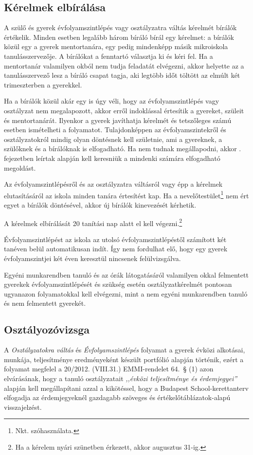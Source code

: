 
\subsection{Kérelmek elbírálása}

A szülő és gyerek évfolyamszintlépés vagy osztályzatra váltás kérelmét bírálók értékelik. Minden esetben legalább három bíráló bírál egy kérelmet: a bírálók közül egy a gyerek mentortanára, egy pedig mindenképp másik mikroiskola tanulásszervezője. A bírálókat a fenntartó választja ki és kéri fel. Ha a mentortanár valamilyen okból nem tudja feladatát elvégezni, akkor helyette az a tanulásszervező lesz a bíráló csapat tagja, aki legtöbb időt töltött az elmúlt két trimeszterben a gyerekkel.

Ha a bírálók közül akár egy is úgy véli, hogy az évfolyamszintlépés vagy osztályzat nem megalapozott, akkor erről indoklással értesítik a gyereket, szüleit és mentortanárát. Ilyenkor a gyerek javíthatja kérelmét és tetszőleges számú esetben ismételheti a folyamatot. Tulajdonképpen az évfolyamszintekről és osztályzatokról mindig olyan döntésnek kell születnie, ami a gyereknek, a szülőknek és a bírálóknak is elfogadható. Ha nem tudnak megállapodni, akkor . fejezetben leírtak alapján kell keresniük a mindenki számára elfogadható megoldást.

Az évfolyamszintlépésről és az osztályzatra váltásról vagy épp a kérelmek elutasításáról az iskola minden tanára értesítést kap. Ha a nevelőtestület\footnote{Nkt. szóhasználata.} nem ért egyet a bírálók döntésével, akkor új bírálók kinevezését kérhetik.

A kérelmek elbírálását 20 tanítási nap alatt el kell végezni.\footnote{Ha a kérelem nyári szünetben érkezett, akkor augusztus 31-ig.}

Évfolyamszintlépést az iskola az utolsó évfolyamszintlépéstől számított két tanéven belül automatikusan indít. Így nem fordulhat elő, hogy egy gyerek évfolyamszintjei két éven keresztül nincsenek felülvizsgálva.

Egyéni munkarendben tanuló és az órák látogatásáról valamilyen okkal felmentett gyerekek évfolyamszintlépését és szükség esetén osztályzatkérelmét pontosan ugyanazon folyamatokkal kell elvégezni, mint a nem egyéni munkarendben tanuló és nem felmentett gyerekét.

\subsection{Osztályozóvizsga}
A \emph{Osztályzatokra váltás} és \emph{Évfolyamszintlépés} folyamat a gyerek évközi alkotásai, munkája, teljesítménye eredményeként készült portfólió alapján történik, ezért a folyamat megfelel a 20/2012. (VIII.31.) EMMI-rendelet 64.~§ (1) azon elvárásának, hogy a tanuló osztályzatait \emph{,,évközi teljesítménye és érdemjegyei''} alapján kell megállapítani azzal a kikötéssel, hogy a Budapest School-kerettanterv elfogadja az érdemjegyeknél gazdagabb szöveges és értékelőtáblázatok-alapú visszajelzést.

